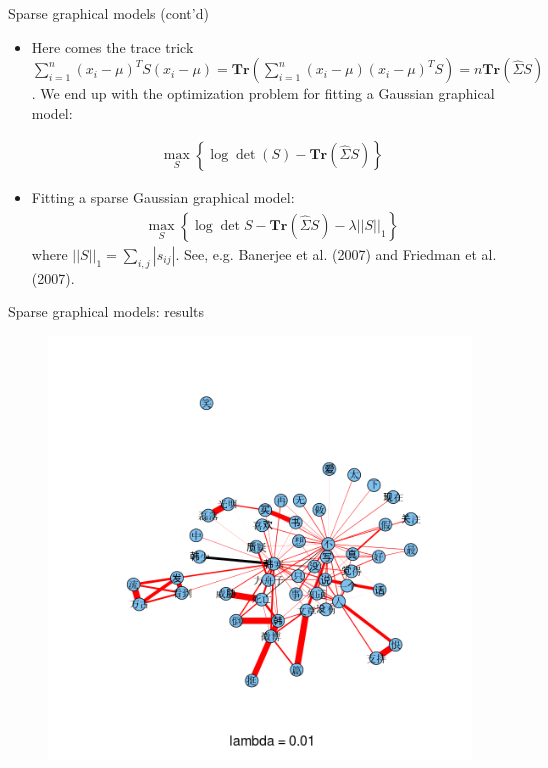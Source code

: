 \documentclass[12pt, trans]{beamer}
\newcommand{\1}[1]{{\mathbf 1}\left\{#1\right\}}        %
\def\lp{\left(}
\def\rp{\right)}
\begin{document}
\begin{frame}[fragile]{Sparse graphical models (cont'd)}

\begin{itemize}[<+->]
\item  Here comes the trace trick $\sum_{i=1}^n(x_i-\mu)^T S (x_i-\mu) = \textbf{Tr} (\sum_{i=1}^n (x_i-\mu)(x_i-\mu)^TS) = n\textbf{Tr}(\hat{\Sigma}S)$. We end up with the optimization problem for fitting a Gaussian graphical model:

\begin{align*}
\max_S \left\{  \log \det \lp S\rp - \textbf{Tr}\lp \hat{\Sigma}S \rp  \right\}
\end{align*}

\item  Fitting a sparse Gaussian graphical model:
\begin{align*}
\max_S \left\{ \log \det S - \textbf{Tr} \lp \hat{\Sigma}S \rp - \lambda ||S||_1 \right\}
\end{align*}
where $||S||_1 = \sum_{i,j}|s_{ij}|$. See, e.g. Banerjee et al. (2007) and Friedman et al. (2007). 

\end{itemize}

\end{frame}

\begin{frame}{Sparse graphical models: results}

\begin{figure}
  \centering
  \includegraphics[height=0.9\textheight]{./../../gLassoResults/glasso1.png} 
\end{figure}

\end{frame}
\end{document}
